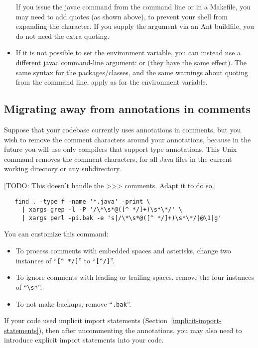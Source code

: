 \begin{itemize}
If you issue the javac command from the command line or in a Makefile, you
may need to add quotes (as shown above), to prevent your shell from
expanding the \code{*} character.
If you supply the  argument via an Ant buildfile,
you do not need the extra quoting.

\item
If it is not possible to set the environment variable,
you can instead use a different javac command-line argument:
 or  (they have the
same effect).  The same syntax for the packages/classes, and the same
warnings about quoting from the command line, apply as for the
 environment variable.

\end{itemize}



\subsection{Migrating away from annotations in comments\label{uncommenting-annotations}}

Suppose that your codebase currently uses annotations in comments, but you
wish to remove the comment characters around your annotations, because in
the future you will use only compilers that support type annotations.
This Unix command removes
the comment characters, for all Java files in the current
working directory or any subdirectory.

[TODO: This doesn't handle the >>> comments.  Adapt it to do so.]

\begin{Verbatim}
   find . -type f -name '*.java' -print \
     | xargs grep -l -P '/\*\s*@([^ */]+)\s*\*/' \
     | xargs perl -pi.bak -e 's|/\*\s*@([^ */]+)\s*\*/|@\1|g'
\end{Verbatim}

You can customize this command:
\begin{itemize}
\item
To process comments with embedded spaces and asterisks, change
two instances of ``\verb|[^ */]|'' to ``\verb|[^/]|''.
\item
To ignore comments with leading or trailing spaces, remove the four
instances of ``\verb|\s*|''.
\item
  To not make backups, remove ``\verb|.bak|''.
\end{itemize}


If your code used implicit import statements
(Section~\ref{implicit-import-statements}), then after uncommenting the
annotations, you may also need to introduce
explicit import statements into your code.


